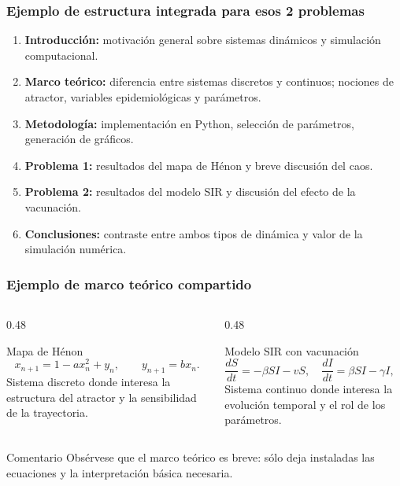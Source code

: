 \begin{frame}
\frametitle{Ejemplo de estructura integrada para esos 2 problemas}
\small
\begin{enumerate}
    \item \textbf{Introducci\'on:} motivaci\'on general sobre sistemas din\'amicos y simulaci\'on computacional.
    \item \textbf{Marco te\'orico:} diferencia entre sistemas discretos y continuos; nociones de atractor, variables epidemiol\'ogicas y par\'ametros.
    \item \textbf{Metodolog\'ia:} implementaci\'on en Python, selecci\'on de par\'ametros, generaci\'on de gr\'aficos.
    \item \textbf{Problema 1:} resultados del mapa de H\'enon y breve discusi\'on del caos.
    \item \textbf{Problema 2:} resultados del modelo SIR y discusi\'on del efecto de la vacunaci\'on.
    \item \textbf{Conclusiones:} contraste entre ambos tipos de din\'amica y valor de la simulaci\'on num\'erica.
\end{enumerate}
\end{frame}

\begin{frame}
\frametitle{Ejemplo de marco te\'orico compartido}
\small
\begin{columns}[T]
\begin{column}{0.48\textwidth}
\begin{block}{Mapa de H\'enon}
\[
 x_{n+1}=1-a x_n^2+y_n,
 \qquad y_{n+1}=b x_n.
\]
Sistema discreto donde interesa la estructura del atractor y la sensibilidad de la trayectoria.
\end{block}
\end{column}
\begin{column}{0.48\textwidth}
\begin{block}{Modelo SIR con vacunaci\'on}
\[
\frac{dS}{dt}=-\beta SI-vS,
\quad
\frac{dI}{dt}=\beta SI-\gamma I,
\quad
\frac{dR}{dt}=\gamma I+vS.
\]
Sistema continuo donde interesa la evoluci\'on temporal y el rol de los par\'ametros.
\end{block}
\end{column}
\end{columns}

\vspace{0.15cm}
\begin{alertblock}{Comentario}
Obs\'ervese que el marco te\'orico es breve: s\'olo deja instaladas las ecuaciones y la interpretaci\'on b\'asica necesaria.
\end{alertblock}
\end{frame}

